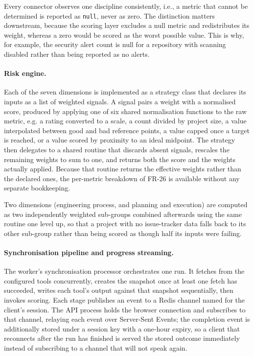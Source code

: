 Every connector observes one discipline consistently, i.e., a metric that cannot be
determined is reported as \texttt{null}, never as zero. The distinction matters
downstream, because the scoring layer excludes a null metric and redistributes
its weight, whereas a zero would be scored as the worst possible value. This is
why, for example, the security alert count is null for a repository with
scanning disabled rather than being reported as no alerts.

\paragraph{Risk engine.}
Each of the seven dimensions is implemented as a strategy class that declares its
inputs as a list of weighted signals. A signal pairs a weight with a
normalised score, produced by applying one of six shared normalisation functions
to the raw metric, e.g. a rating converted to a scale, a count divided by project
size, a value interpolated between good and bad reference points, a value capped
once a target is reached, or a value scored by proximity to an ideal midpoint.
The strategy then delegates to a shared routine that discards absent signals,
rescales the remaining weights to sum to one, and returns both the score and the
weights actually applied. Because that routine returns the effective weights
rather than the declared ones, the per-metric breakdown of FR-26 is available
without any separate bookkeeping.

Two dimensions (engineering process, and planning and execution) are
computed as two independently weighted sub-groups combined afterwards using the
same routine one level up, so that a project with no issue-tracker data falls
back to its other sub-group rather than being scored as though half its inputs
were failing.

\paragraph{Synchronisation pipeline and progress streaming.}
The worker's synchronisation processor orchestrates one run. It fetches from the
configured tools concurrently, creates the snapshot once at least one fetch has
succeeded, writes each tool's output against that snapshot sequentially, then
invokes scoring. Each stage publishes an event to a Redis channel named for the
client's session. The API process holds the browser connection and subscribes to
that channel, relaying each event over Server-Sent Events; the completion event
is additionally stored under a session key with a one-hour expiry, so a client
that reconnects after the run has finished is served the stored outcome
immediately instead of subscribing to a channel that will not speak again.

